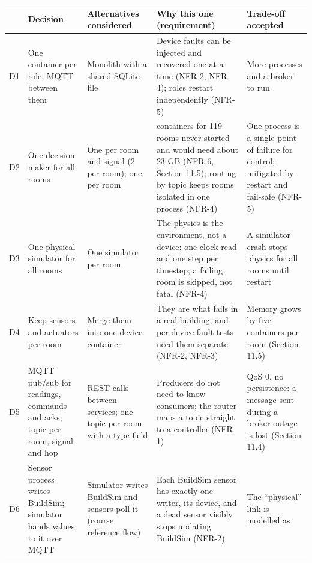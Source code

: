 \documentclass[11pt]{article}
\makeatletter
\DeclareRobustCommand{\_}{\ifmmode\nfss@text{\textunderscore}\else\textunderscore\allowbreak\fi}
\makeatother
\begin{document}
\begin{longtable}[]{@{}
  >{\raggedright\arraybackslash}p{}
  >{\raggedright\arraybackslash}p{}
  >{\raggedright\arraybackslash}p{}
  >{\raggedright\arraybackslash}p{}
  >{\raggedright\arraybackslash}p{}@{}}
\toprule
& \textbf{Decision} & \textbf{Alternatives considered} & \textbf{Why this one (requirement)} & \textbf{Trade-off accepted} \\
\midrule
\endhead
D1 & One container per role, MQTT between them & Monolith with a shared SQLite file &
  Device faults can be injected and recovered one at a time (NFR-2, NFR-4); roles
  restart independently (NFR-5) & More processes and a broker to run \\
D2 & One decision maker for all rooms & One per room and signal (2 per room); one per room &
  952 containers for 119 rooms never started and would need about 23 GB (NFR-6,
  Section 11.5); routing by topic keeps rooms isolated in one process (NFR-4) & One process is a single point of failure for
  control; mitigated by restart and fail-safe (NFR-5) \\
D3 & One physical simulator for all rooms & One simulator per room &
  The physics is the environment, not a device: one clock read and one step per
  timestep; a failing room is skipped, not fatal (NFR-4) & A simulator crash stops
  physics for all rooms until restart \\
D4 & Keep sensors and actuators per room & Merge them into one device container &
  They are what fails in a real building, and per-device fault tests need them
  separate (NFR-2, NFR-3) & Memory grows by five containers per room (Section 11.5) \\
D5 & MQTT pub/sub for readings, commands and acks; topic per room, signal and hop &
  REST calls between services; one topic per room with a type field &
  Producers do not need to know consumers; the router maps a topic straight to a
  controller (NFR-1) & QoS 0, no persistence: a message sent during a broker outage
  is lost (Section 11.4) \\
D6 & Sensor process writes BuildSim; simulator hands values to it over MQTT &
  Simulator writes BuildSim and sensors poll it (course reference flow) &
  Each BuildSim sensor has exactly one writer, its device, and a dead sensor
  visibly stops updating BuildSim (NFR-2) & The ``physical'' link is modelled as

\end{longtable}
\end{document}
